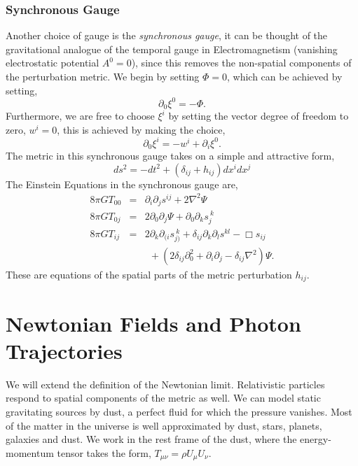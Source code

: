 \subsubsection{Synchronous Gauge}
Another choice of gauge is the \textit{synchronous gauge}, it can be thought of the gravitational analogue of the temporal gauge in Electromagnetism (vanishing electrostatic potential $A^0=0$), since this removes the non-spatial components of the perturbation metric. We begin by setting $\Phi=0$, which can be achieved by setting, 
\begin{equation}
    \partial_0\xi^0=-\Phi.
\end{equation}
Furthermore, we are free to choose $\xi^i$ by setting the vector degree of freedom to zero, $w^i=0$, this is achieved by making the choice, 
\begin{equation}
    \partial_0\xi^i = -w^i + \partial_i\xi^0.
\end{equation}
The metric in this synchronous gauge takes on a simple and attractive form, 
\begin{equation}
    ds^2 = -dt^2 + (\delta_{ij} + h_{ij})dx^{i}dx^{j}\nonumber
\end{equation}
The Einstein Equations in the synchronous gauge are, 
\begin{eqnarray*}
    8\pi GT_{00} &=& \partial_i\partial_js^{ij} + 2\nabla^2\Psi\\
    8\pi GT_{0j} &=& 2\partial_0\partial_j\Psi + \partial_0\partial_{k} s_{j}^{\ k}\\
    8\pi GT_{ij} &=& 2\partial_k\partial_{(i}s_{j)}^{\ k} + \delta_{ij}\partial_{k}\partial_{l}s^{kl} - \Box s_{ij}  \\
    & & \ \ +\left(2\delta_{ij}\partial_0^2+\partial_i\partial_j-\delta_{ij}\nabla^2\right)\Psi.
\end{eqnarray*}
These are equations of the spatial parts of the metric perturbation $h_{ij}$.
\section{Newtonian Fields and Photon Trajectories}
We will extend the definition of the Newtonian limit. Relativistic particles respond to spatial components of the metric as well. We can model static gravitating sources by dust, a perfect fluid for which the pressure vanishes. Most of the matter in the universe is well approximated by dust, stars, planets, galaxies and dust. We work in the rest frame of the dust, where the energy-momentum tensor takes the form, $T_{\mu\nu} = \rho U_{\mu}U_{\nu}$. 

